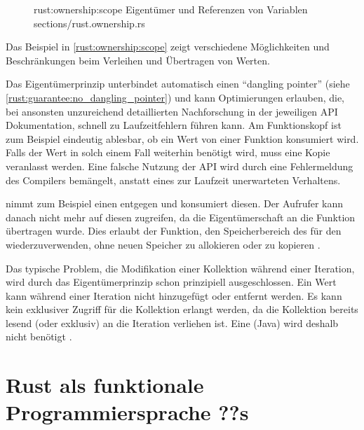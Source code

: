 \begin{figure}[H]
	\rustcinclude
		{rust:ownership:scope}
		{Eigentümer und Referenzen von Variablen}
		{sections/rust.ownership.rs}
\end{figure}

Das Beispiel in \autoref{rust:ownership:scope} zeigt verschiedene Möglichkeiten und Beschränkungen beim Verleihen und Übertragen von Werten.

Das Eigentümerprinzip unterbindet automatisch einen \enquote{dangling pointer} (siehe \autoref{rust:guarantee:no_dangling_pointer}) und kann Optimierungen erlauben, die, bei ansonsten unzureichend detaillierten Nachforschung in der jeweiligen API Dokumentation, schnell zu Laufzeitfehlern führen kann.
Am Funktionskopf ist zum Beispiel eindeutig ablesbar, ob ein Wert von einer Funktion konsumiert wird.
Falls der Wert in solch einem Fall weiterhin benötigt wird, muss eine Kopie veranlasst werden.
Eine falsche Nutzung der API wird durch eine Fehlermeldung des Compilers bemängelt, anstatt eines zur Laufzeit unerwarteten Verhaltens.

 nimmt zum Beispiel einen  entgegen und konsumiert diesen.
Der Aufrufer kann danach nicht mehr auf diesen zugreifen, da die Eigentümerschaft an die Funktion  übertragen wurde.
Dies erlaubt der Funktion, den Speicherbereich des  für den  wiederzuverwenden, ohne neuen Speicher zu allokieren oder zu kopieren \cite{rust:string:from_utf8}.

Das typische Problem, die Modifikation einer Kollektion während einer Iteration, wird durch das Eigentümerprinzip schon prinzipiell ausgeschlossen.
Ein Wert kann während einer Iteration nicht hinzugefügt oder entfernt werden.
Es kann kein exklusiver Zugriff für die Kollektion erlangt werden, da die Kollektion bereits lesend (oder exklusiv) an die Iteration verliehen ist.
Eine  (Java)  wird deshalb nicht benötigt \cite[116]{rust:orly_programming}.

\section{Rust als funktionale Programmiersprache ??s}




